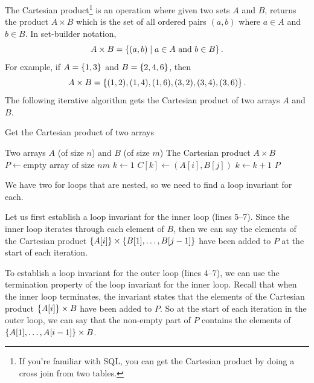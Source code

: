 \begin{example}
    The Cartesian product\footnote{If you're familiar with SQL, you can get the Cartesian product by doing a cross join from two tables.} is an operation where given two sets $A$ and $B$, returns the product $A \times B$ which is the set of all ordered pairs $\left(a, b\right)$ where $a \in A$ and $b \in B$. In set-builder notation,
    \[
        A \times B = \left\{\left(a,b\right) \mid a \in A \text{ and } b \in B\right\}.
    \]
    For example, if $A = \left\{1,3\right\}$ and $B = \left\{2,4,6\right\}$, then 
    \[
        A \times B = \left\{(1,2),(1,4),(1,6),(3,2),(3,4),(3,6)\right\}.
    \]
    The following iterative algorithm gets the Cartesian product of two arrays $A$ and $B$.
    \begin{algorithm}[H]
        \caption{Get the Cartesian product of two arrays}
        \begin{algorithmic}[1]
            \Require Two arrays $A$ (of size $n$) and $B$ (of size $m$)
            \Ensure The Cartesian product $A \times B$
                \State $P \gets \text{empty array of size $nm$}$
                \State $k \gets 1$
                        \State $C[k] \gets \left(A[i], B[j]\right)$
                        \State $k \gets k+1$
                    \EndFor
                \EndFor
                \Return $P$
           \EndFunction
       \end{algorithmic}
   \end{algorithm}

   We have two for loops that are nested, so we need to find a loop invariant for each. 

   Let us first establish a loop invariant for the inner loop (lines 5--7). Since the inner loop iterates through each element of $B$, then we can say the elements of the Cartesian product $\left\{A[i]\right\} \times \left\{B[1],\ldots,B[j-1]\right\}$ have been added to $P$ at the start of each iteration.

   To establish a loop invariant for the outer loop (lines 4--7), we can use the termination property of the loop invariant for the inner loop. Recall that when the inner loop terminates, the invariant states that the elements of the Cartesian product $\left\{A[i]\right\} \times B$ have been added to $P$. So at the start of each iteration in the outer loop, we can say that the non-empty part of $P$ contains the elements of $\left\{A[1],\ldots,A[i-1]\right\} \times B$.


\end{example}

